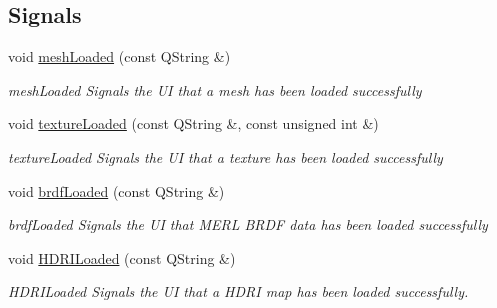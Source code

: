 \subsection*{Signals}
\begin{DoxyCompactItemize}
\item 
\hypertarget{classNGLScene_ab7b1e32434f2a2c2f0dd1ece6661ca79}{void \hyperlink{classNGLScene_ab7b1e32434f2a2c2f0dd1ece6661ca79}{mesh\-Loaded} (const Q\-String \&)}\label{classNGLScene_ab7b1e32434f2a2c2f0dd1ece6661ca79}

\begin{DoxyCompactList}\small\item\em mesh\-Loaded Signals the U\-I that a mesh has been loaded successfully \end{DoxyCompactList}\item 
\hypertarget{classNGLScene_acaf032b837c09feaf534779a216923cd}{void \hyperlink{classNGLScene_acaf032b837c09feaf534779a216923cd}{texture\-Loaded} (const Q\-String \&, const unsigned int \&)}\label{classNGLScene_acaf032b837c09feaf534779a216923cd}

\begin{DoxyCompactList}\small\item\em texture\-Loaded Signals the U\-I that a texture has been loaded successfully \end{DoxyCompactList}\item 
\hypertarget{classNGLScene_a219b32b4e420ecf8510b282e39f6c954}{void \hyperlink{classNGLScene_a219b32b4e420ecf8510b282e39f6c954}{brdf\-Loaded} (const Q\-String \&)}\label{classNGLScene_a219b32b4e420ecf8510b282e39f6c954}

\begin{DoxyCompactList}\small\item\em brdf\-Loaded Signals the U\-I that M\-E\-R\-L B\-R\-D\-F data has been loaded successfully \end{DoxyCompactList}\item 
\hypertarget{classNGLScene_ac31e02ed631b1d67aa1d43d31bb8e4fe}{void \hyperlink{classNGLScene_ac31e02ed631b1d67aa1d43d31bb8e4fe}{H\-D\-R\-I\-Loaded} (const Q\-String \&)}\label{classNGLScene_ac31e02ed631b1d67aa1d43d31bb8e4fe}

\begin{DoxyCompactList}\small\item\em H\-D\-R\-I\-Loaded Signals the U\-I that a H\-D\-R\-I map has been loaded successfully. \end{DoxyCompactList}\end{DoxyCompactItemize}
